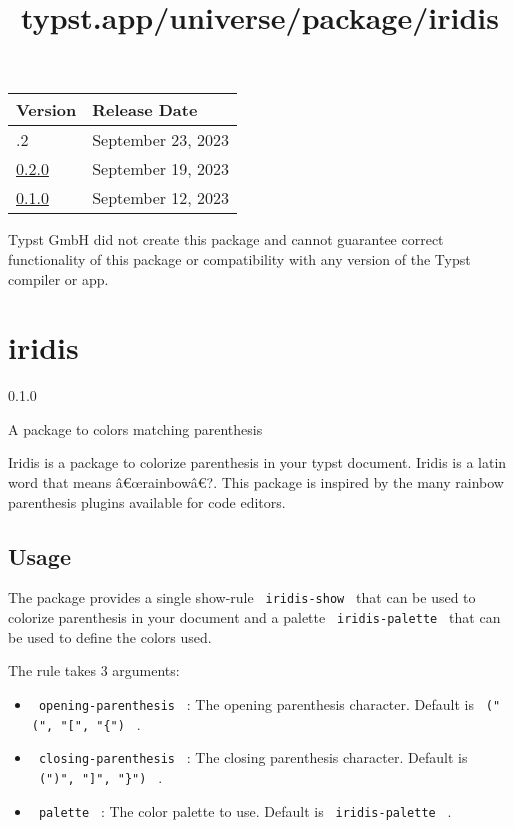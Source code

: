 \begin{longtable}[]{@{}ll@{}}
\toprule\noalign{}
Version & Release Date \\
\midrule\noalign{}
\endhead
\bottomrule\noalign{}
\endlastfoot
0.2.2 & September 23, 2023 \\
\href{https://typst.app/universe/package/codetastic/0.2.0/}{0.2.0} &
September 19, 2023 \\
\href{https://typst.app/universe/package/codetastic/0.1.0/}{0.1.0} &
September 12, 2023 \\
\end{longtable}

Typst GmbH did not create this package and cannot guarantee correct
functionality of this package or compatibility with any version of the
Typst compiler or app.


\title{typst.app/universe/package/iridis}

\label{banner}
\section{iridis}\label{iridis}

{ 0.1.0 }

A package to colors matching parenthesis

\label{readme}
Iridis is a package to colorize parenthesis in your typst document.
Iridis is a latin word that means â€œrainbowâ€?. This package is
inspired by the many rainbow parenthesis plugins available for code
editors.

\subsection{Usage}\label{usage}

The package provides a single show-rule \texttt{\ iridis-show\ } that
can be used to colorize parenthesis in your document and a palette
\texttt{\ iridis-palette\ } that can be used to define the colors used.

The rule takes 3 arguments:

\begin{itemize}
\tightlist
\item
  \texttt{\ opening-parenthesis\ } : The opening parenthesis character.
  Default is \texttt{\ ("(",\ "{[}",\ "\{")\ } .
\item
  \texttt{\ closing-parenthesis\ } : The closing parenthesis character.
  Default is \texttt{\ (")",\ "{]}",\ "\}")\ } .
\item
  \texttt{\ palette\ } : The color palette to use. Default is
  \texttt{\ iridis-palette\ } .
\end{itemize}

